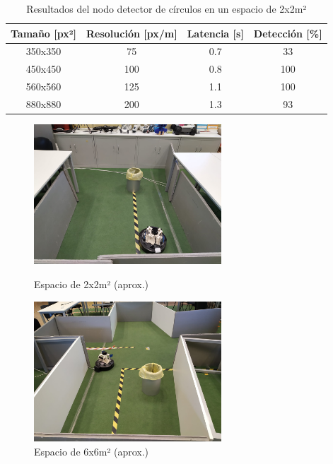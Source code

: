 \begin{table}[h!]
\begin{center}
\begin{tabular}{|c|c|c|c|}
\hline
\textbf{Tamaño [px²]} & \textbf{Resolución [px/m]} & \textbf{Latencia [s]} & \textbf{Detección [\%]} \\
\hline
350x350 & 75  & 0.7 & 33  \\
450x450 & 100 & 0.8 & 100 \\
560x560 & 125 & 1.1 & 100 \\
880x880 & 200 & 1.3 & 93  \\
\hline
\end{tabular}
\caption{Resultados del nodo detector de círculos en un espacio de 2x2m²}
\label{tab:circle_results_2x2}
\end{center}
\end{table}

\begin{figure}[h!]
  \centering
  \begin{minipage}{0.45\textwidth}
    \centering
    \includegraphics[width=7cm]{figs/lab_2x2_photo}
    \caption{Espacio de 2x2m² (aprox.)}
    \label{fig:lab_2x2_photo}
  \end{minipage}
  \hfill
  \begin{minipage}{0.45\textwidth}
    \centering
    \includegraphics[width=7cm]{figs/lab_6x6_photo}
    \caption{Espacio de 6x6m² (aprox.)}
    \label{fig:lab_6x6_photo}
  \end{minipage}
\end{figure}\

